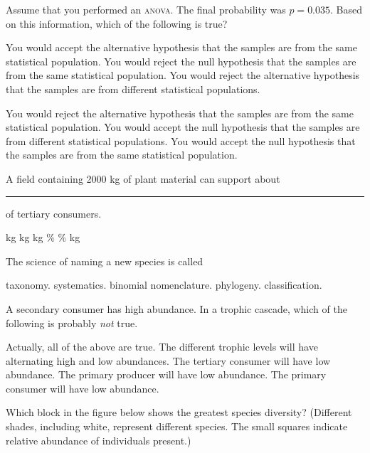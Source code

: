 \question
Assume that you performed an \textsc{anova}. The final probability was $p = 0.035$. Based on this information, which of the following is true?

\begin{choices}
\choice You would accept the alternative hypothesis that the samples are from the same statistical population. 
\correctchoice You would reject the null hypothesis that the samples are from the same statistical population. 
\choice You would reject the alternative hypothesis that the samples are from different statistical populations.
 
\choice You would reject the alternative hypothesis that the samples are from the same statistical population. 
\choice You would accept the null hypothesis that the samples are from different statistical populations. 
\choice You would accept the null hypothesis that the samples are from the same statistical population. 
\end{choices}

\question
A field containing 2000 kg of plant material can support about \rule{1in}{0.4pt} of tertiary consumers.

\begin{choices}
 kg 
 kg 
 kg 
\% 
\% 
 kg 
\end{choices}

\question
The science of naming a new species is called

\begin{choices}
\correctchoice  taxonomy. 
\choice systematics. 
\choice binomial nomenclature. 
\choice phylogeny. 
\choice classification. 
\end{choices}

\newpage

\question
A secondary consumer has high abundance. In a trophic cascade, which of the following is probably \emph{not} true.
\begin{choices}
\choice Actually, all of the above are true. 
\choice The different trophic levels will have alternating high and low abundances. 
\choice The tertiary consumer will have low abundance. 
\correctchoice The primary producer will have low abundance. 
\choice The primary consumer will have low abundance. 
\end{choices}

\question
Which block in the figure below shows the greatest species diversity? (Different shades, including white, represent different species. The small squares indicate relative abundance of individuals present.)


